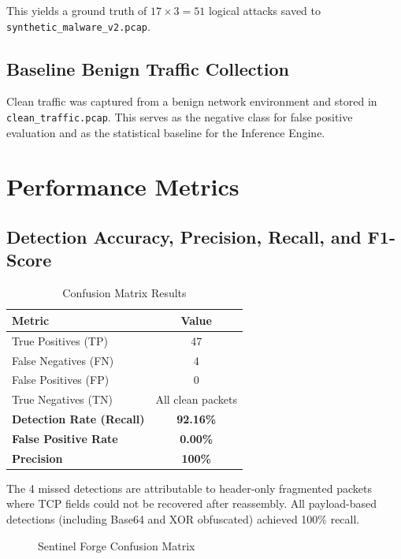 This yields a ground truth of $17 \times 3 = 51$ logical attacks saved to \texttt{synthetic\_malware\_v2.pcap}.

\subsection{Baseline Benign Traffic Collection}

Clean traffic was captured from a benign network environment and stored in \texttt{clean\_traffic.pcap}. This serves as the negative class for false positive evaluation and as the statistical baseline for the Inference Engine.

\section{Performance Metrics}

\subsection{Detection Accuracy, Precision, Recall, and F1-Score}

\begin{table}[h]
\centering
\caption{Confusion Matrix Results}
\label{tab:confusion}
\begin{tabular}{|l|c|}
\hline
\textbf{Metric} & \textbf{Value} \\
\hline
True Positives (TP) & 47 \\
\hline
False Negatives (FN) & 4 \\
\hline
False Positives (FP) & 0 \\
\hline
True Negatives (TN) & All clean packets \\
\hline
\textbf{Detection Rate (Recall)} & \textbf{92.16\%} \\
\hline
\textbf{False Positive Rate} & \textbf{0.00\%} \\
\hline
\textbf{Precision} & \textbf{100\%} \\
\hline
\end{tabular}
\end{table}

The 4 missed detections are attributable to header-only fragmented packets where TCP fields could not be recovered after reassembly. All payload-based detections (including Base64 and XOR obfuscated) achieved 100\% recall.

\begin{figure}[h]
\centering
{}
\caption{Sentinel Forge Confusion Matrix}
\label{fig:confusion_matrix}
\end{figure}

